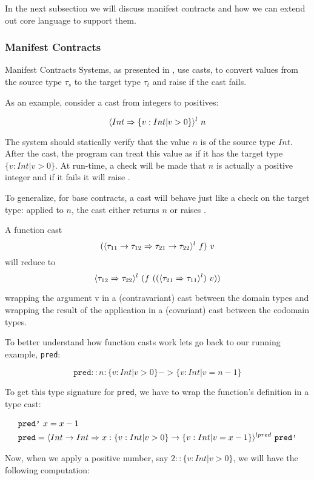 In the next subsection we will discuss manifest contracts and
how we can extend out core language to support them.

\subsubsection{Manifest Contracts}

Manifest Contracts Systems, as presented in \cite{Greenberg12}, use casts,
to convert values from the source type $\tau_s$ 
to the target type $\tau_t$ and raise 
if the cast fails.

As an example, consider a cast from integers to positives:

$$
\ecast{Int}{\{v:Int | v > 0\}}{l} \ n
$$

The system should statically verify that the value $n$ is 
of the source type $Int$.
After the cast, the program can treat this value as
if it has the target type $\{v:Int | v > 0\}$.
At run-time, a check will be made that $n$ 
is actually a positive integer and if it fails it will raise .

To generalize, for base contracts, a cast will behave just like a check on the target type: 
applied to $n$, the cast either returns $n$ or raises  . 

A function cast 
$$
(\langle \tau_{11} \rightarrow \tau_{12} \Rightarrow \tau_{21} \rightarrow \tau_{22} \rangle^{l}
 \ f ) \ v
$$
will reduce to 
$$
\ecast{\tau_{12}}{\tau_{22}}{l}\ (f \ ((\ecast{\tau_{21}}{\tau_{11}}{l}) \ v))
$$

wrapping the argument v in a (contravariant) cast between the domain types
and wrapping the result of the application in a (covariant) cast between the
codomain types.

To better understand how function casts work lets go back to 
our running example, \texttt{pred}:

$$
\texttt{pred} ::n:\{v:Int | v > 0\} -> \{v:Int | v = n - 1\} 
$$

To get this type signature for \texttt{pred}, we have to wrap the function's definition 
in a type cast:

\begin{align*}
& \texttt{pred'}\ x= x - 1 \\
& \texttt{pred}  = \langle Int \rightarrow Int \Rightarrow x:\{v:Int | v > 0\} -> \{v:Int | v = x - 1\} \rangle^{lpred} \ \texttt{pred'}
\end{align*}


Now, when we apply a positive number, say $2 :: \{v:Int | v > 0\}$, we will have the following computation:

